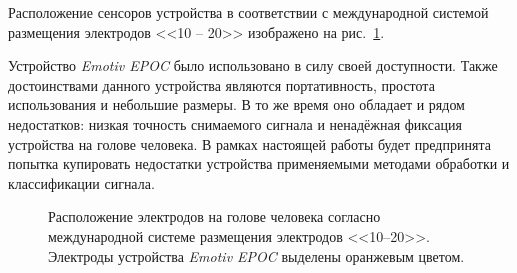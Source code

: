 \documentclass[12pt,fleqn]{article}
\begin{document}
	\par Расположение сенсоров устройства в соответствии с международной системой размещения электродов <<10 -- 20>> изображено на рис.~\ref{electrode_map}.
	\par Устройство {\it Emotiv EPOC} было использовано в силу своей доступности. Также достоинствами данного устройства являются портативность, простота использования и небольшие размеры. В то же время оно обладает и рядом недостатков: низкая точность снимаемого сигнала и ненадёжная фиксация устройства на голове человека. В рамках настоящей работы будет предпринята попытка купировать недостатки устройства применяемыми методами обработки и классификации сигнала.

	\begin{figure}[h!]
		\caption{Расположение электродов на голове человека согласно международной системе размещения электродов <<10--20>>. Электроды устройства {\it Emotiv EPOC} выделены оранжевым цветом.}
	\label{electrode_map}
	\end{figure}
\end{document}
